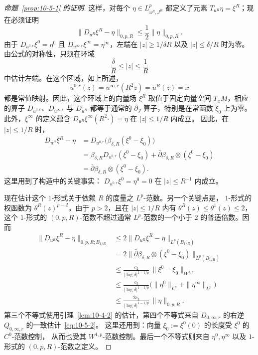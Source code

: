 \begin{proof}[命题~\ref{prop:10-5-1} 的证明]
这样，对每个 $\eta\in L_{u^R,J^R}^p$ 都定义了元素
$T_{u^R}\eta=\xi^R$；现在必须证明
\begin{equation}\label{eq:10-5-5}
  \|D_{u^R}\xi^R-\eta\|_{0,p,R}
  \le\frac12\|\eta\|_{0,p,R}.
\end{equation}
由于 $D_{u^{0,r}}\xi^0=\eta^0$ 且
$D_{u^{\infty,r}}\xi^\infty=\eta^\infty$，左端在
$|z|\ge1/\delta R$ 以及 $|z|\le\delta/R$ 时为零。由公式的对称性，只须在环域
\[
  \frac{\delta}{R}\le|z|\le\frac1R
\]
中估计左端。在这个区域，如上所述，
\[
  u^{0,r}(z)=u^{\infty,r}(R^2z)=u^R(z)=x
\]
都是常值映射。因此，这个环域上的向量场 $\xi^R$ 取值于固定向量空间
$T_xM$，相应的算子 $D_{u^{0,r}}$、$D_{u^{\infty,r}}$ 与 $D_{u^R}$
都等于通常的 $\bar\partial_J$ 算子，特别是在常函数 $\xi_0$ 上为零。
此外，$\xi^\infty$ 的定义蕴含
$D_{u^R}\xi^\infty(R^2\mathord\cdot)=\eta$ 在 $|z|\le1/R$ 内成立。
因此，在 $|z|\le1/R$ 时，
\[
\begin{aligned}
  D_{u^R}\xi^R-\eta
  &=D_{u^{0,r}}\bigl(\beta_{\delta,R}(\xi^0-\xi_0)\bigr)\\
  &=\beta_{\delta,R}D_{u^{0,r}}(\xi^0-\xi_0)
    +\bar\partial\beta_{\delta,R}\otimes(\xi^0-\xi_0)\\
  &=\bar\partial\beta_{\delta,R}\otimes(\xi^0-\xi_0).
\end{aligned}
\]
这里用到了构造中的关键事实：
$D_{u^{0,r}}\xi^0=\eta^0=0$ 在 $|z|\le R^{-1}$ 内成立。

现在估计这个 $1$-形式关于依赖 $R$ 的度量之 $L^p$-范数。另一个关键点是，
$1$-形式的权函数为 $\theta^R(z)^{p-2}$。由于 $p>2$，且在
$|z|\le1/R$ 内有 $\theta^R(z)\le\theta^1(z)\le2$，这个 $1$-形式的
$(0,p,R)$-范数不超过通常 $L^p$-范数的一个小于 $2$ 的普适倍数。因而
\[
\begin{aligned}
 \|D_{u^R}\xi^R-\eta\|_{0,p,R;B_{1/R}}
 &\le2\|D_{u^R}\xi^R-\eta\|_{L^p(B_{1/R})}\\
 &=2\|\bar\partial\beta_{\delta,R}\otimes(\xi^0-\xi_0)\|_{L^p(B_{1/R})}\\
 &\le\frac{c_2}{|\log\delta|^{1-1/p}}\,
       \|\xi^0-\xi_0\|_{W^{1,p}}\\
 &\le\frac{c_3}{|\log\delta|^{1-1/p}}
       \bigl(\|\eta^0\|_{L^p}+\|\eta^\infty\|_{L^p}\bigr)\\
 &\le\frac{2c_3}{|\log\delta|^{1-1/p}}\,
       \|\eta\|_{0,p,R}.
\end{aligned}
\]
第三个不等式使用引理~\ref{lem:10-4-2} 的估计，第四个不等式来自
$D_{0,\infty,r}$ 的右逆 $Q_{0,\infty,r}$ 的一致估计~\eqref{eq:10-5-2}。
这里还用到：向量 $\xi_0:=\xi^0(0)$ 的长度受 $\xi^0$ 的 $C^0$-范数控制，
从而也受其 $W^{1,p}$-范数控制。最后一个不等式则来自
$\eta^0,\eta^\infty$ 以及 $1$-形式的 $(0,p,R)$-范数之定义。


\end{proof}
